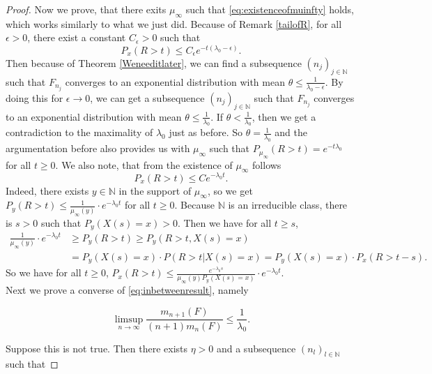 \documentclass[12pt,a4paper]{scrartcl}
\numberwithin{equation}{section}
\newcommand{\N}{\mathbb{N}} %
\begin{document}
\begin{proof}
Now we prove, that there exits $ \mu_{\infty} $ such that \eqref{eq:existenceofmuinfty} holds, which works similarly to what we just did. Because of Remark \ref{tailofR}, for all $ \epsilon > 0 $, there exist a constant $ C_{\epsilon} > 0$ such that
$$ P_x\left(R > t \right) \leq C_{\epsilon} e^{-t\left(\lambda_0 - \epsilon \right)}. $$
Then because of Theorem \ref{Weneeditlater}, we can find a subsequence $\left(n_j\right)_{j \in \N}$ such that $ F_{n_j} $ converges to an exponential distribution with mean $\theta \leq \frac{1}{\lambda_0-\epsilon} $. By doing this for $ \epsilon \to 0 $, we can get a subsequence $\left(n_j\right)_{j \in \N}$ such that $ F_{n_j} $ converges to an exponential distribution with mean $\theta \leq \frac{1}{\lambda_0} $. If $ \theta < \frac{1}{\lambda_0} $, then we get a contradiction to the maximality of $ \lambda_0 $ just as before. So $\theta = \frac{1}{\lambda_0}$ and the argumentation before also provides us with $ \mu_{\infty} $ such that $P_{\mu_{\infty}}\left(R > t\right) = e^{-t \lambda_0}$ for all $t \geq 0$. We also note, that from the existence of $ \mu_{\infty} $ follows
$$ P_x\left(R > t\right) \leq Ce^{-\lambda_0 t} .$$  Indeed, there exists $ y \in \N$ in the support of $\mu_{\infty}$, so we get $P_y\left(R > t\right) \leq \frac{1}{\mu_{\infty}\left(y\right)} \cdot e^{-\lambda_0 t}$ for all $ t\geq 0$. Because $\N$ is an irreducible class, there is $s > 0$ such that $P_y\left(X\left(s\right) = x\right) > 0$. Then we have for all $ t \geq s$,
\begin{align*}
\frac{1}{\mu_{\infty}\left(y\right)} \cdot e^{-\lambda_0 t} &\geq P_y\left(R > t\right) \geq P_y\left(R > t, X\left(s\right) = x\right) \\
&= P_y\left(X\left(s\right) = x\right) \cdot P\left(R > t| X\left(s\right) = x\right) = P_y\left(X\left(s\right) = x\right) \cdot P_x\left(R > t-s\right).
\end{align*}
So we have for all $ t \geq 0 $, $P_x\left(R > t\right) \leq \frac{e^{-\lambda_0 s}}{\mu_{\infty}\left(y\right) P_y\left(X\left(s\right) = x\right) }\cdot e^{-\lambda_0 t}$. \\[2ex]


Next we prove a converse of \eqref{eq:inbetweenresult}, namely

\begin{equation}
\limsup_{n \to \infty} \frac{m_{n+1}\left(F\right)}{\left(n+1\right) m_n\left(F\right)} \leq \frac{1}{\lambda_0}.
\end{equation}

Suppose this is not true. Then there exists $\eta > 0$ and a subsequence $ \left(n_l\right)_{l \in \N} $ such that


\end{proof}
\end{document}
